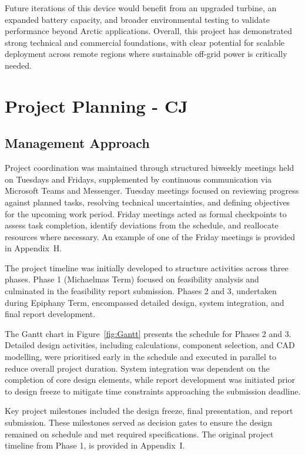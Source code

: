\documentclass[11pt,a4paper]{article}
\begin{document}
Future iterations of this device would benefit from an upgraded turbine, an expanded battery capacity, and broader environmental testing to validate performance beyond Arctic applications. Overall, this project has demonstrated strong technical and commercial foundations, with clear potential for scalable deployment across remote regions where sustainable off-grid power is critically needed.

\section{Project Planning - CJ}

\subsection{Management Approach}

Project coordination was maintained through structured biweekly meetings held on Tuesdays and Fridays, supplemented by continuous communication via Microsoft Teams and Messenger. Tuesday meetings focused on reviewing progress against planned tasks, resolving technical uncertainties, and defining objectives for the upcoming work period. Friday meetings acted as formal checkpoints to assess task completion, identify deviations from the schedule, and reallocate resources where necessary. An example of one of the Friday meetings is provided in Appendix~H.

The project timeline was initially developed to structure activities across three phases. Phase 1 (Michaelmas Term) focused on feasibility analysis and culminated in the feasibility report submission. Phases 2 and 3, undertaken during Epiphany Term, encompassed detailed design, system integration, and final report development.

The Gantt chart in Figure~\ref{fig:Gantt} presents the schedule for Phases 2 and 3. Detailed design activities, including calculations, component selection, and CAD modelling, were prioritised early in the schedule and executed in parallel to reduce overall project duration. System integration was dependent on the completion of core design elements, while report development was initiated prior to design freeze to mitigate time constraints approaching the submission deadline.

Key project milestones included the design freeze, final presentation, and report submission. These milestones served as decision gates to ensure the design remained on schedule and met required specifications. The original project timeline from Phase 1, is provided in Appendix~I.
\end{document}
